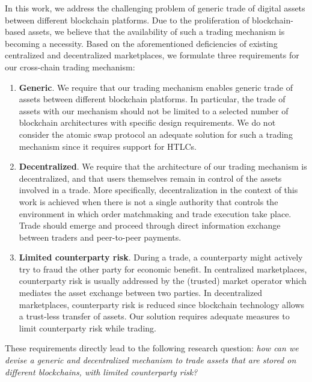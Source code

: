 
In this work, we address the challenging problem of generic trade of digital assets between different blockchain platforms.
Due to the proliferation of blockchain-based assets, we believe that the availability of such a trading mechanism is becoming a necessity.
Based on the aforementioned deficiencies of existing centralized and decentralized marketplaces, we formulate three requirements for our cross-chain trading mechanism:

\begin{enumerate}
	\item \textbf{Generic}. We require that our trading mechanism enables generic trade of assets between different blockchain platforms. In particular, the trade of assets with our mechanism should not be limited to a selected number of blockchain architectures with specific design requirements. We do not consider the atomic swap protocol an adequate solution for such a trading mechanism since it requires support for HTLCs.
	\item \textbf{Decentralized}. We require that the architecture of our trading mechanism is decentralized, and that users themselves remain in control of the assets involved in a trade. More specifically, decentralization in the context of this work is achieved when there is not a single authority that controls the environment in which order matchmaking and trade execution take place. Trade should emerge and proceed through direct information exchange between traders and peer-to-peer payments.
	\item \textbf{Limited counterparty risk}. During a trade, a counterparty might actively try to fraud the other party for economic benefit. In centralized marketplaces, counterparty risk is usually addressed by the (trusted) market operator which mediates the asset exchange between two parties. In decentralized marketplaces, counterparty risk is reduced since blockchain technology allows a trust-less transfer of assets. Our solution requires adequate measures to limit counterparty risk while trading.
\end{enumerate}

These requirements directly lead to the following research question: \emph{how can we devise a generic and decentralized mechanism to trade assets that are stored on different blockchains, with limited counterparty risk?}

